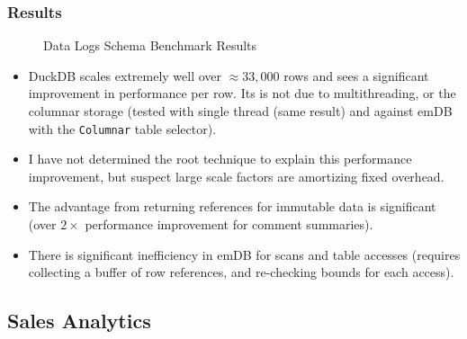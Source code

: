 \subsubsection{Results}
\begin{figure}[h!]
    \centering
    \vspace{-0.4em}
    \resizebox{\textwidth}{!}{}
    \caption{Data Logs Schema Benchmark Results}
    \label{fig:data_log_benchmark_results}
\end{figure}
\begin{itemize}
    \setlength\itemsep{0em}
    \item DuckDB scales extremely well over $\approx 33,000$ rows and sees a significant improvement in performance per row. Its is not due to multithreading, or the columnar storage (tested with single thread (same result) and against emDB with the \texttt{Columnar} table selector).
    \item I have not determined the root technique to explain this performance improvement, but suspect large scale factors are amortizing fixed overhead.
    \item The advantage from returning references for immutable data is significant (over $2\times$ performance improvement for comment summaries).
    \item  There is significant inefficiency in emDB for scans and table accesses (requires collecting a buffer of row references, and re-checking bounds for each access).  
\end{itemize}
\subsection{Sales Analytics}
